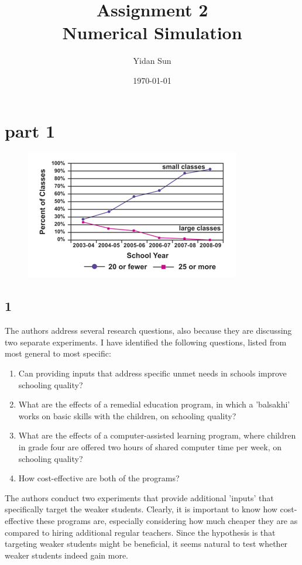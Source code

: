 \documentclass[a4paper]{article}
\title{Assignment 2\\Numerical Simulation}
\author{Yidan Sun}
\date{\today}
\begin{document}
	\maketitle
	\section*{part 1}
	\begin{figure}
		\centering
		\includegraphics[scale=1]{figure1}
	\end{figure}
	\subsection*{1}
	The authors address several research questions, also because they are discussing two separate experiments. I have identified the following questions, listed from most general to most specific:
	\begin{enumerate}
		\item Can providing inputs that address specific unmet needs in schools improve schooling quality?
		\item What are the effects of a remedial education program, in which a 'balsakhi' works on basic skills with the children, on schooling quality?
		\item What are the effects of a computer-assisted learning program, where children in grade four are offered two hours of shared computer time per week, on schooling quality? 
		\item How cost-effective are both of the programs?
	\end{enumerate}
	
	The authors conduct two experiments that provide additional 'inputs' that specifically target the weaker students. Clearly, it is important to know how cost-effective these programs are, especially considering how much cheaper they are as compared to hiring additional regular teachers. Since the hypothesis is that targeting weaker students might be beneficial, it seems natural to test whether weaker students indeed gain more. 
	 
\end{document}
